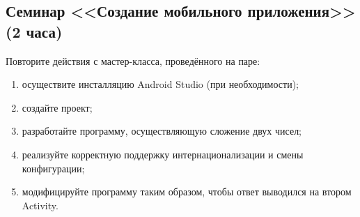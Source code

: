 \subsection{Семинар <<Создание мобильного приложения>> (2 часа)}

Повторите действия с мастер-класса, проведённого на паре:
\begin{enumerate}
	\item осуществите инсталляцию Android Studio (при необходимости);
	\item создайте проект;
	\item разработайте программу, осуществляющую сложение двух чисел;
	\item реализуйте корректную поддержку интернационализации и смены конфигурации;
	\item модифицируйте программу таким образом, чтобы ответ выводился на втором Activity.
\end{enumerate}

